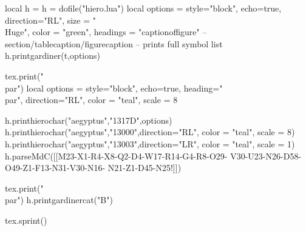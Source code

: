 \documentclass{article}
\begin{document}
\newfontfamily{}
\newfontfamily{}
\newfontfamily{}
\parindent0pt
\raggedright


\begin{luacode*}
    local h = {}
          h = dofile("hiero.lua")
    local options = {style="block",
                     echo=true,
                     direction="RL",
                     size = "\\Huge",
                     color = "green",
                     headings = "captionof{figure}"  -- section/tablecaption/figurecaption
                     }
   -- prints full symbol list
   h.printgardiner(t,options)

   tex.print("\\par")
   local options = {style="block",
                     echo=true,
                     heading="\\par",
                     direction="RL",
                     color = "teal",
                     scale = 8}

   h.printhierochar("aegyptus","1317D",options)
   h.printhierochar("aegyptus","13000",{direction="RL",
                                        color = "teal",
                                        scale = 8})
   h.printhierochar("aegyptus","13003",{direction="LR",
                                        color = "teal",
                                        scale = 1})
   h.parseMdC([[M23-X1-R4-X8-Q2-D4-W17-R14-G4-R8-O29-
               V30-U23-N26-D58-O49-Z1-F13-N31-V30-N16-
               N21-Z1-D45-N25!]])

   tex.print("\\par")
   h.printgardinercat("B")

   tex.sprint()

\end{luacode*}

\newcommand\hierochar[2][direction = "LR",
                         color     = "teal",
                         scale     = 1]{%
               \luaexec{
                h = h or {}
                h = require("hiero.lua")  
                h.parseMdC(#2,{#1})}}
               
\newcommand\printhierochar[3][direction = "LR",
                              color     = "teal",
                              scale     = 4]{%
               \luaexec{
                h = h or {}
                h = require("hiero.lua")  
                h.printhierochar(#2,#3,{#1})}}
\end{document}
